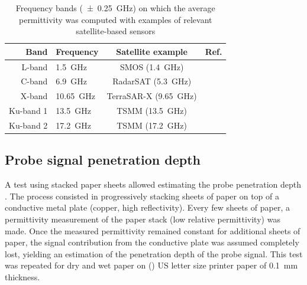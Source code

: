 \begin{table}[ht!]
    \centering
    \caption{Frequency bands (\qty{\pm0.25}{\giga\hertz}) on which the average permittivity was computed with examples of relevant satellite-based sensors}\label{tab:freq-range}
    \begin{tabular}{r l c c}
        Band & Frequency & Satellite example & Ref. \\
        \midrule\midrule
        L-band & \qty{1.5}{\giga\hertz} & SMOS (\qty{1.4}{\giga\hertz}) & \parencite{Kerr2010}\\
        C-band & \qty{6.9}{\giga\hertz} & RadarSAT (\qty{5.3}{\giga\hertz}) & \parencite{Morena2004} \\
        X-band & \qty{10.65}{\giga\hertz} & TerraSAR-X (\qty{9.65}{\giga\hertz}) & \parencite{Werninghaus2010} \\
        Ku-band 1 & \qty{13.5}{\giga\hertz} & TSMM (\qty{13.5}{\giga\hertz}) & \parencite{Derksen2019,Garnaud2019} \\
        Ku-band 2 & \qty{17.2}{\giga\hertz} & TSMM (\qty{17.2}{\giga\hertz}) & \\
    \end{tabular}
\end{table}

\subsection{Probe signal penetration depth}\label{subsec:metho-paper}
A test using stacked paper sheets allowed estimating the probe penetration depth \parencite{Elrayes1987}.
The process consisted in progressively stacking sheets of paper on top of a conductive metal plate (copper, high reflectivity).
Every few sheets of paper, a permittivity measurement of the paper stack (low relative permittivity) was made.
Once the measured permittivity remained constant for additional sheets of paper, the signal contribution from the conductive plate was assumed completely lost, yielding an estimation of the penetration depth of the probe signal.
This test was repeated for dry and wet paper on  () US letter size printer paper of \qty{0.1}{\milli\metre} thickness. %

